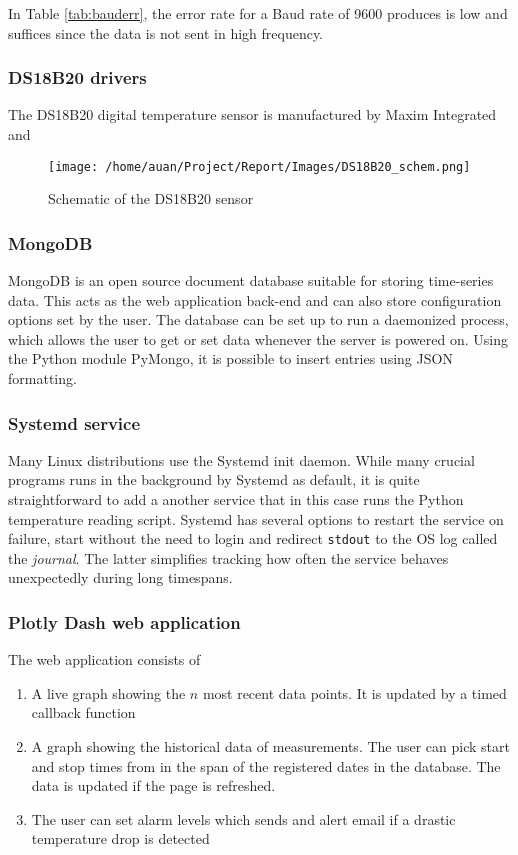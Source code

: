In Table \ref{tab:bauderr}, the error rate for a Baud rate of 9600 produces is low and suffices since the data is not sent in high frequency. 

\subsubsection{DS18B20 drivers}%
\label{ssub:ds18b20_drivers}
The DS18B20 digital temperature sensor is manufactured by Maxim Integrated and 

\begin{figure}[h]
  \centering
  \texttt{[image: /home/auan/Project/Report/Images/DS18B20\_schem.png]}
  \caption{Schematic of the DS18B20 sensor}
  \label{fig:sensorschem}
\end{figure}
\subsubsection{MongoDB}%
\label{ssub:mongodb}
MongoDB is an open source document database suitable for storing time-series data. This acts as the web application back-end and can also store configuration options set by the user. The database can be set up to run a daemonized process, which allows the user to get or set data whenever the server is powered on. Using the Python module PyMongo, it is possible to insert entries using JSON formatting.

\subsubsection{Systemd service}%
\label{ssub:systemd_service}
Many Linux distributions use the Systemd init daemon. While many crucial programs runs in the background by Systemd as default, it is quite straightforward to add a another service that in this case runs the Python temperature reading script. Systemd has several options to restart the service on failure, start without the need to login and redirect \verb|stdout| to the OS log called the \textit{journal}. The latter simplifies tracking how often the service behaves unexpectedly during long timespans.




\subsubsection{Plotly Dash web application}%
\label{ssub:plotly_dash_web_application}
The web application consists of
\begin{enumerate}
  \item A live graph showing the $n$ most recent data points. It is updated by a timed callback function
  \item A graph showing the historical data of measurements. The user can pick start and stop times from in the span of the registered dates in the database. The data is updated if the page is refreshed.
  \item The user can set alarm levels which sends and alert email if a drastic temperature drop is detected
\end{enumerate}

